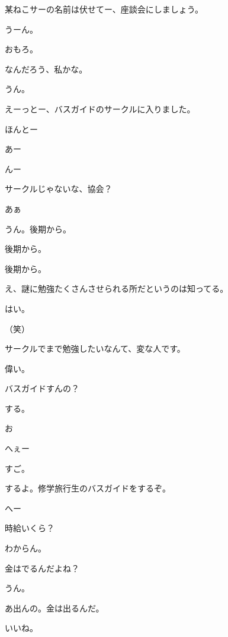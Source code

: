\begin{multicols}{3}
{        某ねこサーの名前は伏せてー、座談会にしましょう。

        うーん。

        おもろ。

        なんだろう、私かな。

        うん。

        えーっとー、バスガイドのサークルに入りました。

        ほんとー

        あー

        んー

        サークルじゃないな、協会？

        あぁ

        うん。後期から。

        後期から。

        後期から。

        え、謎に勉強たくさんさせられる所だというのは知ってる。

        はい。

        （笑）

        サークルでまで勉強したいなんて、変な人です。

        偉い。

        バスガイドすんの？

        する。

        お

        へぇー

        すご。

        するよ。修学旅行生のバスガイドをするぞ。

        へー

        時給いくら？

        わからん。

        金はでるんだよね？

        うん。

        あ出んの。金は出るんだ。

        いいね。

}
\end{multicols}
